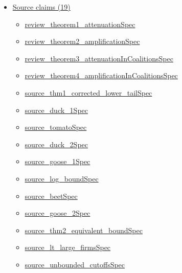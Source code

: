 \documentclass[10pt]{article}
\begin{document}
\begin{itemize}[leftmargin=1.2em]
\begin{itemize}[leftmargin=1.2em]
\end{itemize}
\item \hyperlink{source-section-f10b5f68e4acf3dc}{Source claims (19)}
\begin{itemize}[leftmargin=1.2em]
\item \hyperlink{source-claim-4ecaf547b8a4bff9}{review\_\allowbreak{}theorem1\_\allowbreak{}attenuation\allowbreak{}Spec}
\item \hyperlink{source-claim-9e706cf872adcab7}{review\_\allowbreak{}theorem2\_\allowbreak{}amplification\allowbreak{}Spec}
\item \hyperlink{source-claim-62c35df4a96426fc}{review\_\allowbreak{}theorem3\_\allowbreak{}attenuation\allowbreak{}In\allowbreak{}Coalitions\allowbreak{}Spec}
\item \hyperlink{source-claim-09a28f818364c658}{review\_\allowbreak{}theorem4\_\allowbreak{}amplification\allowbreak{}In\allowbreak{}Coalitions\allowbreak{}Spec}
\item \hyperlink{source-claim-68004cb711da81c5}{source\_\allowbreak{}thm1\_\allowbreak{}corrected\_\allowbreak{}lower\_\allowbreak{}tail\allowbreak{}Spec}
\item \hyperlink{source-claim-baab78c419a8d66e}{source\_\allowbreak{}duck\_\allowbreak{}1\allowbreak{}Spec}
\item \hyperlink{source-claim-059a664ca2f2c12c}{source\_\allowbreak{}tomato\allowbreak{}Spec}
\item \hyperlink{source-claim-2f4e3f42143d1dc8}{source\_\allowbreak{}duck\_\allowbreak{}2\allowbreak{}Spec}
\item \hyperlink{source-claim-8894ff8f48aa126b}{source\_\allowbreak{}goose\_\allowbreak{}1\allowbreak{}Spec}
\item \hyperlink{source-claim-0288a6d97ff1b834}{source\_\allowbreak{}log\_\allowbreak{}bound\allowbreak{}Spec}
\item \hyperlink{source-claim-331214905b993ae6}{source\_\allowbreak{}beet\allowbreak{}Spec}
\item \hyperlink{source-claim-96a16163ca076128}{source\_\allowbreak{}goose\_\allowbreak{}2\allowbreak{}Spec}
\item \hyperlink{source-claim-5395bd56b3a3fad8}{source\_\allowbreak{}thm2\_\allowbreak{}equivalent\_\allowbreak{}bound\allowbreak{}Spec}
\item \hyperlink{source-claim-ab8439dc4f2d61d9}{source\_\allowbreak{}lt\_\allowbreak{}large\_\allowbreak{}firms\allowbreak{}Spec}
\item \hyperlink{source-claim-ff22377c4e341e25}{source\_\allowbreak{}unbounded\_\allowbreak{}cutoffs\allowbreak{}Spec}

\end{itemize}
\end{itemize}
\end{document}
